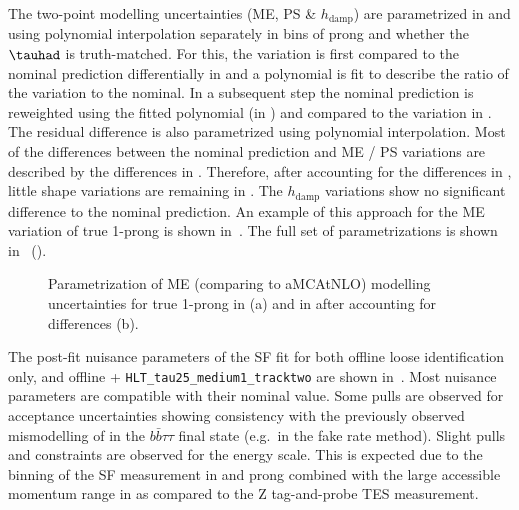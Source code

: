 The two-point \ttbar modelling uncertainties (ME, PS \&
$h_\text{damp}$) are parametrized in \tauhad \pT and \mtw using
polynomial interpolation separately in bins of \tauhad prong and
whether the $\tauhad$ is truth-matched. For this, the variation is
first compared to the nominal prediction differentially in \tauhad \pT
and a polynomial is fit to describe the ratio of the variation to the
nominal. In a subsequent step the nominal prediction is reweighted
using the fitted polynomial (in \tauhad \pT) and compared to the
variation in \mtw. The residual difference is also parametrized using
polynomial interpolation. Most of the differences between the nominal
prediction and ME / PS variations are described by the differences in
\tauhad \pT. Therefore, after accounting for the differences in
\tauhad \pT, little shape variations are remaining in \mtw. The
$h_\text{damp}$ variations show no significant difference to the
nominal prediction. An example of this approach for the ME variation
of true 1-prong \tauhad is shown
in~. The full set of
parametrizations is shown in~
().

\begin{figure}[htbp]
  \centering
  \caption{Parametrization of ME (comparing to aMCAtNLO) \ttbar
    modelling uncertainties for true 1-prong \tauhad in \tauhad \pT
    (a) and in \mtw after accounting for \tauhad \pT differences (b).}
  \label{fig:ttbarfake_hadhad_ttbar_modelling}
\end{figure}

The post-fit nuisance parameters of the SF fit for both offline loose
\tauhad identification only, and offline +
\verb|HLT_tau25_medium1_tracktwo| are shown
in~. Most nuisance parameters are
compatible with their nominal value. Some pulls are observed for
\ttbar acceptance uncertainties showing consistency with the
previously observed mismodelling of \ttbar in the $b\bar{b}\tau\tau$
final state (e.g.\ in the fake rate method). Slight pulls and
constraints are observed for the \tauhad energy scale. This is
expected due to the binning of the SF measurement in \tauhad \pT and
\tauhad prong combined with the large accessible momentum range in
\ttbar as compared to the Z tag-and-probe TES measurement.

